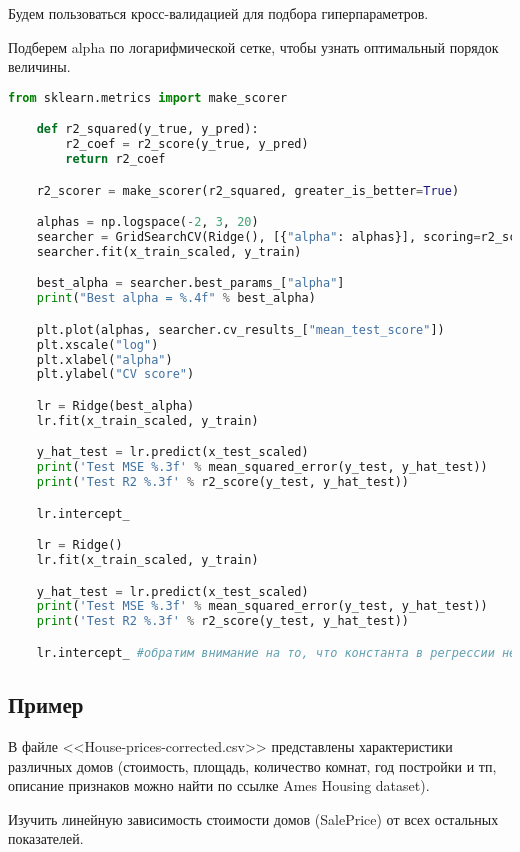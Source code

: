 Будем пользоваться кросс-валидацией для подбора гиперпараметров.

Подберем alpha по логарифмической сетке, чтобы узнать оптимальный порядок величины.

\begin{lstlisting}[language=Python]
	from sklearn.metrics import make_scorer

	def r2_squared(y_true, y_pred):
	    r2_coef = r2_score(y_true, y_pred)
	    return r2_coef

	r2_scorer = make_scorer(r2_squared, greater_is_better=True)

	alphas = np.logspace(-2, 3, 20)
	searcher = GridSearchCV(Ridge(), [{"alpha": alphas}], scoring=r2_scorer, cv=10) #scoring="r2"
	searcher.fit(x_train_scaled, y_train)

	best_alpha = searcher.best_params_["alpha"]
	print("Best alpha = %.4f" % best_alpha)

	plt.plot(alphas, searcher.cv_results_["mean_test_score"])
	plt.xscale("log")
	plt.xlabel("alpha")
	plt.ylabel("CV score")

	lr = Ridge(best_alpha) 
	lr.fit(x_train_scaled, y_train)

	y_hat_test = lr.predict(x_test_scaled)
	print('Test MSE %.3f' % mean_squared_error(y_test, y_hat_test))
	print('Test R2 %.3f' % r2_score(y_test, y_hat_test))

	lr.intercept_

	lr = Ridge() 
	lr.fit(x_train_scaled, y_train)

	y_hat_test = lr.predict(x_test_scaled)
	print('Test MSE %.3f' % mean_squared_error(y_test, y_hat_test))
	print('Test R2 %.3f' % r2_score(y_test, y_hat_test))

	lr.intercept_ #обратим внимание на то, что константа в регрессии не регуляризуется
\end{lstlisting}

\subsection*{Пример}\label{cha:linreg2/subsec:prob}

\begin{problem}
	В файле <<House-prices-corrected.csv>> представлены характеристики различных домов (стоимость, площадь, количество комнат, год постройки и тп, описание признаков можно найти по ссылке Ames Housing dataset).
	
	Изучить линейную зависимость стоимости домов (SalePrice) от всех остальных показателей.
\end{problem}

